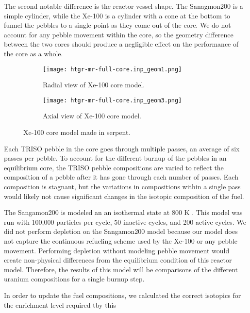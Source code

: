 The second 
notable difference is the reactor vessel shape. The Sanagmon200 is a simple 
cylinder, while the Xe-100 is a cylinder with a cone at the bottom to funnel 
the pebbles to a single point as they come out of the core. We do not account 
for any pebble movement within the core, so the geometry difference between 
the two cores should produce a negligible effect on the performance of the 
core as a whole.

\begin{figure}
    \centering 
    \begin{subfigure}{0.45\textwidth}
        \centering 
        \texttt{[image: htgr-mr-full-core.inp\_geom1.png]}
        \caption{Radial view of Xe-100 core model.}
        \label{fig:xe100_core_radial}        
    \end{subfigure}
    \hfill
    \begin{subfigure}{0.45\textwidth}
        \centering 
        \texttt{[image: htgr-mr-full-core.inp\_geom3.png]}
        \caption{Axial view of Xe-100 core model.}
        \label{fig:xe100_core_axial}        
    \end{subfigure}
    \caption{Xe-100 core model made in serpent.}
    \label{fig:xe100_core}
\end{figure}

Each \gls{TRISO} pebble in the core goes through multiple passes, an average 
of six passes per pebble. To account for the different burnup of 
the pebbles in an equilibrium core, the \gls{TRISO} pebble compositions are 
varied to reflect the composition of a pebble after it has gone through 
each number of passes. Each composition is stagnant, 
but the variations in 
compositions within a single pass would likely not cause significant 
changes in the isotopic composition of the fuel. 

The Sangamon200 is modeled an an isothermal state at 800 K \cite{richter_isotopic_2022}.
This model was run with 100,000 particles per cycle, 50 inactive cycles, 
and 200 active cycles. We did not perform depletion on the Sangamon200 model 
because our model 
does not capture the continuous refueling scheme used by the Xe-100 or 
any pebble movement. Performing depletion without modeling pebble movement 
would create non-physical differences from the equilibrium condition of 
this reactor model. Therefore, the results of this model will be comparisons
of the different uranium compositions for a single burnup step.

In order to update the fuel compositions, we calculated the correct 
isotopics for the enrichment level required tby this

